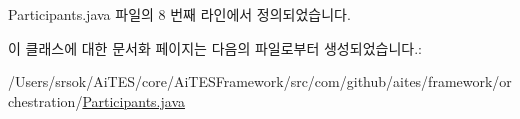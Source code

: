 Participants.\+java 파일의 8 번째 라인에서 정의되었습니다.



이 클래스에 대한 문서화 페이지는 다음의 파일로부터 생성되었습니다.\+:\begin{DoxyCompactItemize}
\item 
/\+Users/srsok/\+Ai\+T\+E\+S/core/\+Ai\+T\+E\+S\+Framework/src/com/github/aites/framework/orchestration/\mbox{\hyperlink{_participants_8java}{Participants.\+java}}\end{DoxyCompactItemize}
